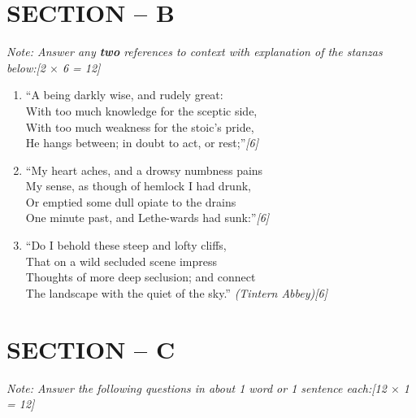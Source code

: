 \documentclass[11pt,a4paper]{article}
\newcommand{\pts}[1]{\hfill \textit{[#1]}}
\begin{document}
\bigskip

\section*{SECTION -- B}
\noindent \textit{Note: Answer any \textbf{two} references to context with explanation of the stanzas below:}\pts{2 $\times$ 6 = 12}

\begin{enumerate}[label=(\alph*),leftmargin=*,itemsep=10pt]

  \item ``A being darkly wise, and rudely great:\\
  With too much knowledge for the sceptic side,\\
  With too much weakness for the stoic's pride,\\
  He hangs between; in doubt to act, or rest;''\pts{6}

  \item ``My heart aches, and a drowsy numbness pains\\
  My sense, as though of hemlock I had drunk,\\
  Or emptied some dull opiate to the drains\\
  One minute past, and Lethe-wards had sunk:''\pts{6}

  \item ``Do I behold these steep and lofty cliffs,\\
  That on a wild secluded scene impress\\
  Thoughts of more deep seclusion; and connect\\
  The landscape with the quiet of the sky.'' \textit{(Tintern Abbey)}\pts{6}

\end{enumerate}

\bigskip

\section*{SECTION -- C}
\noindent \textit{Note: Answer the following questions in about 1 word or 1 sentence each:}\pts{12 $\times$ 1 = 12}
\end{document}
